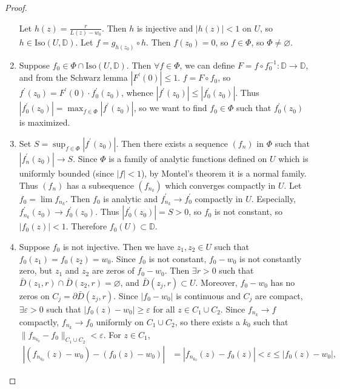 \begin{proof}
\begin{enumerate}
{    Let $h(z) = \frac{r}{L(z) - w_0}$. Then $h$ is injective and
    $|h(z)| < 1$ on $U$, so
    $h \in \mathrm{Iso}(U, \mathbb{D})$.
    Let $f = g_{h(z_0)} \circ h$. Then $f(z_0) = 0$, so $f \in \Phi$,
    so $\Phi \neq \varnothing$.
  }
  \item{
    Suppose $f_0 \in \Phi \cap \mathrm{Iso}(U, \mathbb{D})$. Then
    $\forall f \in \Phi$, we can define
    $F = f \circ f_0^{-1} : \mathbb{D} \to \mathbb{D}$, and from
    the Schwarz lemma $|F^\prime(0)| \leq 1$.
    $f = F \circ f_0$, so
    $f^\prime(z_0) = F^\prime(0) \cdot f_0^\prime(z_0)$, whence
    $|f^\prime(z_0)| \leq |f_0^\prime(z_0)|$. Thus
    $|f_0^\prime(z_0)| = \max_{f \in \Phi} |f^\prime(z_0)|$, so we
    want to find $f_0 \in \Phi$ such that $f_0^\prime(z_0)$ is
    maximized.
  }
  \item{
    Set $S = \sup_{f \in \Phi} |f^\prime(z_0)|$. Then there exists a
    sequence $(f_n)$ in $\Phi$ such that $|f_n^\prime(z_0)| \to S$.
    Since $\Phi$ is a family of analytic functions defined on $U$
    which is uniformly bounded (since $|f| < 1$), by Montel's theorem
    it is a normal family. Thus $(f_n)$ has a subsequence $(f_{n_k})$ which
    converges compactly in $U$. Let $f_0 = \lim f_{n_k}$. Then
    $f_0$ is analytic and $f_{n_k}^\prime \to f_0^\prime$ compactly
    in $U$. Especially, $f_{n_k}^\prime(z_0) \to f_0^\prime(z_0)$.
    Thus $|f_0^\prime(z_0)| = S > 0$,
    so $f_0$ is not constant, so $|f_0(z)| < 1$. Therefore
    $f_0(U) \subset \mathbb{D}$.
  }
  \item{
    Suppose $f_0$ is not injective. Then we have $z_1, z_2 \in U$
    such that $f_0(z_1) = f_0(z_2) = w_0$. Since $f_0$ is not constant,
    $f_0 - w_0$ is not constantly zero, but $z_1$ and $z_2$ are zeros
    of $f_0 - w_0$. Then $\exists r > 0$ such that
    $\bar{D}(z_1, r) \cap \bar{D}(z_2, r) = \varnothing$, and
    $\bar{D}(z_j, r) \subset U$. Moreover, $f_0 - w_0$ has no zeros
    on $C_j = \partial \bar{D}(z_j, r)$. Since $|f_0 - w_0|$ is
    continuous and $C_j$ are compact, $\exists \varepsilon > 0$
    such that $|f_0(z) - w_0| \geq \varepsilon$ for all
    $z \in C_1 \cup C_2$. Since $f_{n_k} \to f$ compactly,
    $f_{n_k} \to f_0$ uniformly on $C_1 \cup C_2$, so there exists
    a $k_0$ such that $\| f_{n_{k_0}} - f_0 \|_{C_1 \cup C_2} <
    \varepsilon$.
    For $z \in C_1$,
    \begin{align*}
          |(f_{n_{k_0}}(z) - w_0) - (f_0(z) - w_0)|
    &=    |f_{n_{k_0}}(z) - f_0(z)|
     <    \varepsilon
     \leq |f_0(z) - w_0|,
    \end{align*}
}
\end{enumerate}
\end{proof}
